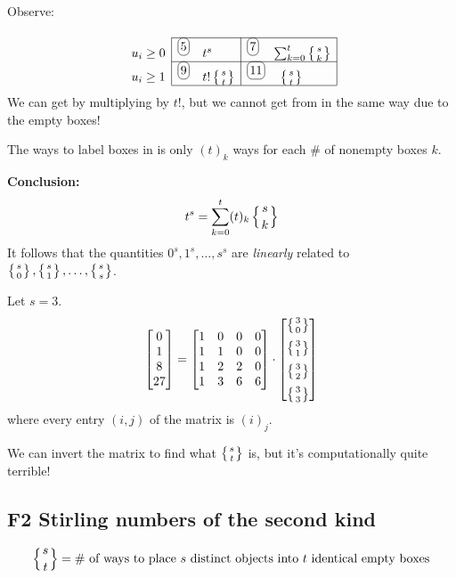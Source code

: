 \documentclass[12pt]{article}
\begin{document}
\rmk Observe: \[\begin{array}[t]{l|l|l|}
    \cline{2-3}
    u_i\geq 0 & {^{\circled{5}}\quad} t^s&{^{\circled{7}}\quad} \sum_{k=0}^{t}\squig{s}{k}\\\cline{2-3}
    u_i\geq 1 & {^{\circled{9}}\quad}t!\squig{s}{t}& {^{\circled{11}}\quad}\squig{s}{t}\\
    \cline{2-3}
\end{array}\]
We can get  by multiplying  by $t!$, but we cannot get  from  in the same way due to the empty boxes!

The ways to label boxes in  is only $(t)_k$ ways for each \# of nonempty boxes $k$.

\textbf{Conclusion: } \[t^s = \sum_{k=0}^{t}(t)_k\left\{{s \atop k}\right\}\]
It follows that the quantities $0^s, 1^s,\dots ,s^s$ are \textit{linearly} related to $\left\{{s \atop 0}\right\}, \left\{{s \atop 1}\right\},\dots, \left\{{s \atop s}\right\}$.

\eg Let $s=3$. \[
    \begin{bmatrix}
        0\\1\\8\\27
    \end{bmatrix} =
    \begin{bmatrix}
        1&0&0&0\\
        1&1&0&0\\
        1&2&2&0\\
        1&3&6&6
    \end{bmatrix}\cdot
    \begin{bmatrix}
        \left\{{3 \atop 0}\right\}\\[6pt]\left\{{3 \atop 1}\right\}\\[6pt]\left\{{3 \atop 2}\right\}\\[6pt]\left\{{3 \atop 3}\right\}
    \end{bmatrix}
    \]
where every entry $(i,j)$ of the matrix is $(i)_j$.

We can invert the matrix to find what $\left\{{s \atop t}\right\}$ is, but it's computationally quite terrible!

\subsection{F2 Stirling numbers of the second kind}

 \[\left\{{s \atop t}\right\}=\text{\# of ways to place $s$ distinct objects into $t$ identical empty boxes}\]
\end{document}
